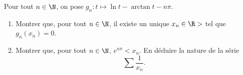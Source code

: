 \begin{enonce}
\begin{exercise}[ID={RMS135 E1449},subtitle={IMT MP 2024},tags={},difficulty={}]

Pour tout $n \in \N$, on pose $g_n : t \mapsto \ln t - \arctan t - n\pi$.

\begin{enumerate}
  \item Montrer que, pour tout $n \in \N$, il existe un unique $x_n \in \R>$ tel que $g_n(x_n) = 0$.
  \item Montrer que, pour tout $n \in \N$, $e^{n\pi} < x_n$. En déduire la nature de la série 
  \begin{equation*}
  \sum \frac{1}{x_n}.
  \end{equation*}
\end{enumerate}

\end{exercise}
\begin{solution}
\end{solution}
\end{enonce}
